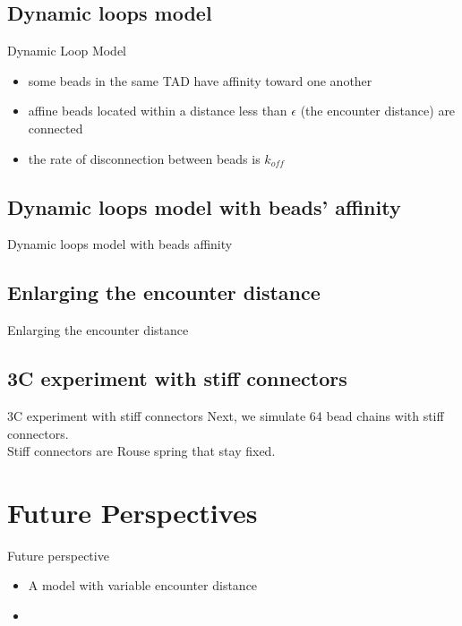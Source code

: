 \documentclass[8pt]{beamer}
\begin{document}
\subsection{Dynamic loops model}
\begin{frame}{Dynamic Loop Model}
\begin{itemize}
\item some beads in the same TAD have affinity toward one another
\item affine beads located within a distance less than $\epsilon$ (the encounter distance) are connected
\item the rate of disconnection between beads is $k_{off}$
\end{itemize}
\end{frame}

\subsection{Dynamic loops model with beads' affinity}
\begin{frame}{Dynamic loops model with beads affinity}
\end{frame}

\subsection{Enlarging the encounter distance}
\begin{frame}{Enlarging the encounter distance}
\end{frame}

\subsection{3C experiment with stiff connectors}
\begin{frame}{3C experiment with stiff connectors}
Next, we simulate 64 bead chains with stiff connectors.\\
Stiff connectors are Rouse spring that stay fixed.\\
\end{frame}

\section{Future Perspectives}
\begin{frame}{Future perspective}
\begin{itemize}
\item A model with variable encounter distance
\item 
\end{itemize}
\end{frame}
\end{document}
